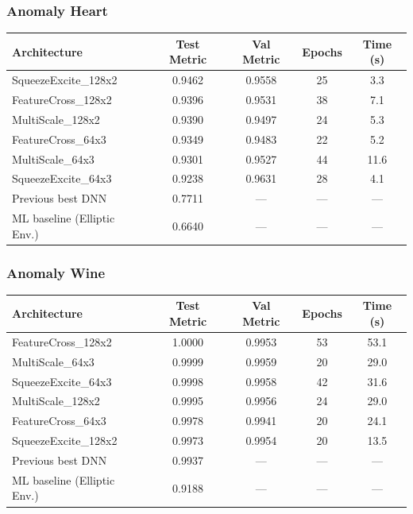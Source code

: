 \documentclass[11pt,a4paper]{article}
\begin{document}
\subsubsection*{Anomaly Heart}

\begin{center}
\small
\begin{tabular}{lcccc}
\toprule
\textbf{Architecture} & \textbf{Test Metric} & \textbf{Val Metric} & \textbf{Epochs} & \textbf{Time (s)} \\
\midrule
SqueezeExcite\_128x2 & 0.9462 & 0.9558 & 25 & 3.3 \\
FeatureCross\_128x2 & 0.9396 & 0.9531 & 38 & 7.1 \\
MultiScale\_128x2 & 0.9390 & 0.9497 & 24 & 5.3 \\
FeatureCross\_64x3 & 0.9349 & 0.9483 & 22 & 5.2 \\
MultiScale\_64x3 & 0.9301 & 0.9527 & 44 & 11.6 \\
SqueezeExcite\_64x3 & 0.9238 & 0.9631 & 28 & 4.1 \\
\midrule
Previous best DNN & 0.7711 & --- & --- & --- \\
ML baseline (Elliptic Env.) & 0.6640 & --- & --- & --- \\
\bottomrule
\end{tabular}
\end{center}

\subsubsection*{Anomaly Wine}

\begin{center}
\small
\begin{tabular}{lcccc}
\toprule
\textbf{Architecture} & \textbf{Test Metric} & \textbf{Val Metric} & \textbf{Epochs} & \textbf{Time (s)} \\
\midrule
FeatureCross\_128x2 & 1.0000 & 0.9953 & 53 & 53.1 \\
MultiScale\_64x3 & 0.9999 & 0.9959 & 20 & 29.0 \\
SqueezeExcite\_64x3 & 0.9998 & 0.9958 & 42 & 31.6 \\
MultiScale\_128x2 & 0.9995 & 0.9956 & 24 & 29.0 \\
FeatureCross\_64x3 & 0.9978 & 0.9941 & 20 & 24.1 \\
SqueezeExcite\_128x2 & 0.9973 & 0.9954 & 20 & 13.5 \\
\midrule
Previous best DNN & 0.9937 & --- & --- & --- \\
ML baseline (Elliptic Env.) & 0.9188 & --- & --- & --- \\
\bottomrule
\end{tabular}
\end{center}
\end{document}

